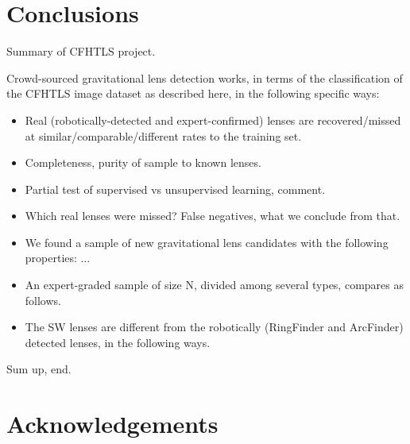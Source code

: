 \documentclass[useAMS,usenatbib,a4paper]{mn2e}
\begin{document}

\section{Conclusions}
\label{sec:conclude}

Summary of CFHTLS project.

Crowd-sourced gravitational lens detection works, in terms of the
classification of the CFHTLS image dataset as described here, in the following
specific ways: 

\begin{itemize} 

\item Real (robotically-detected and expert-confirmed) lenses are
recovered/missed at similar/comparable/different rates to the
training set. 

\item Completeness, purity of \sw sample to known lenses.

\item Partial test of supervised vs unsupervised learning, comment.

\item Which real lenses were missed? False negatives, what we conclude from
that.

\item We found a
sample of new gravitational lens candidates with the following properties: ...

\item An expert-graded sample of size N, divided among several types, compares
as follows.

\item The SW lenses are different from the robotically (RingFinder and
ArcFinder) detected lenses, in the following ways.


\end{itemize}

Sum up, end.


\section*{Acknowledgements}
 

\end{document}

